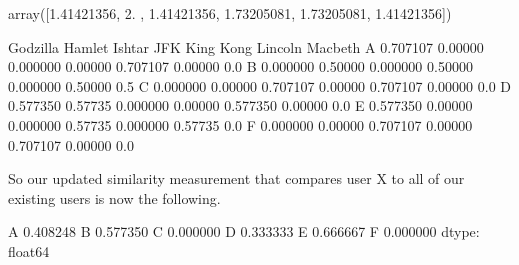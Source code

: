 \documentclass[letterpaper,10pt,english]{sphinxmanual}
\begin{document}
\begin{sphinxVerbatim}[commandchars=\\\{\}]
     
\end{sphinxVerbatim}

\begin{sphinxVerbatim}[commandchars=\\\{\}]
array([1.41421356, 2.        , 1.41421356, 1.73205081, 1.73205081,
       1.41421356])
\end{sphinxVerbatim}

\begin{sphinxVerbatim}[commandchars=\\\{\}]
     
\end{sphinxVerbatim}

\begin{sphinxVerbatim}[commandchars=\\\{\}]
   Godzilla   Hamlet    Ishtar      JFK  King Kong  Lincoln  Macbeth
A  0.707107  0.00000  0.000000  0.00000   0.707107  0.00000      0.0
B  0.000000  0.50000  0.000000  0.50000   0.000000  0.50000      0.5
C  0.000000  0.00000  0.707107  0.00000   0.707107  0.00000      0.0
D  0.577350  0.57735  0.000000  0.00000   0.577350  0.00000      0.0
E  0.577350  0.00000  0.000000  0.57735   0.000000  0.57735      0.0
F  0.000000  0.00000  0.707107  0.00000   0.707107  0.00000      0.0
\end{sphinxVerbatim}

So our updated similarity measurement that compares user X to all of our existing users is now the following.

\begin{sphinxVerbatim}[commandchars=\\\{\}]
  
\end{sphinxVerbatim}

\begin{sphinxVerbatim}[commandchars=\\\{\}]
A    0.408248
B    0.577350
C    0.000000
D    0.333333
E    0.666667
F    0.000000
dtype: float64
\end{sphinxVerbatim}
\end{document}
